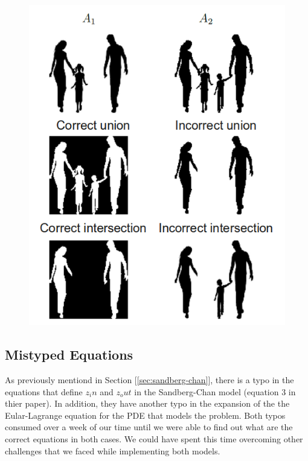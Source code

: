 \documentclass[10pt,twocolumn,letterpaper]{article}
\begin{document}
\begin{figure}[t]
\centering
\includegraphics[width=\textwidth]{phidef.png}
\caption{}
\label{fig:phidef}
\end{figure}

\subsection{Mistyped Equations}
As previously mentiond in Section [\ref{sec:sandberg-chan}], there is a typo in the equations that define $z_in$ and $z_out$ in the Sandberg-Chan model
(equation 3 in thier paper). In addition, they have another typo in the expansion of the the Eular-Lagrange equation for the PDE that models the problem. Both
typos consumed over a week of our time until we were able to find out what are the correct equations in both cases. We could have spent this time overcoming
other challenges that we faced while implementing both models.
\end{document}
